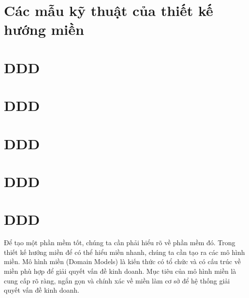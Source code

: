 \section{Các mẫu kỹ thuật của thiết kế hướng miền}

\section{DDD}

\section{DDD}

\section{DDD}

\section{DDD}

\section{DDD}


Để tạo một phần mềm tốt, chúng ta cần phải hiểu rõ về phần mềm đó. Trong thiết kế hướng miền để có thể hiểu miền nhanh, chúng ta cần tạo ra các mô hình miền. Mô hình miền (Domain Models) là kiến thức có tổ chức và có cấu trúc về miền phù hợp để giải quyết vấn đề kinh doanh. Mục tiêu của mô hình miền là cung cấp rõ ràng, ngắn gọn và chính xác về miền làm cơ sở để hệ thống giải quyết vấn đề kinh doanh.




